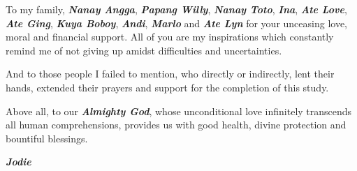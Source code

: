 {To my family, \textbf{\textit{Nanay Angga}}, \textbf{\textit{Papang Willy}}, \textbf{\textit{Nanay Toto}}, \textbf{\textit{Ina}}, \textbf{\textit{Ate Love}}, \textbf{\textit{Ate Ging}}, \textbf{\textit{Kuya Boboy}}, \textbf{\textit{Andi}}, \textbf{\textit{Marlo}} and \textbf{\textit{Ate Lyn}} for your unceasing love, moral and financial support. All of you are my inspirations which constantly remind me of not giving up amidst difficulties and uncertainties.

And to those people I failed to mention, who directly or indirectly, lent their hands, extended their prayers and support for the completion of this study. 

Above all, to our \textbf{\textit{Almighty God}}, whose unconditional love infinitely transcends all human comprehensions, provides us with good health, divine protection and bountiful blessings.

\begin{flushright}
\textbf{\textit{Jodie}}
\end{flushright}



}